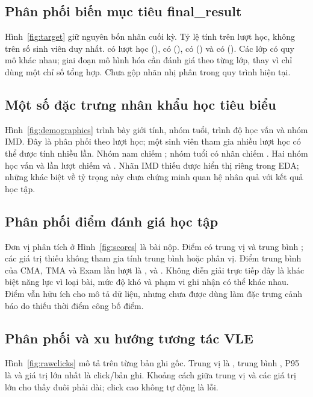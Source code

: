 \subsection{Phân phối biến mục tiêu final\_result}
Hình~\ref{fig:target} giữ nguyên bốn nhãn cuối kỳ. Tỷ lệ tính trên \NEnrollments{} lượt học, không trên số sinh viên duy nhất.
 có \NPass{} lượt học (\PctPass),  có \NWithdrawn{} (\PctWithdrawn),  có \NFail{} (\PctFail) và  có \NDistinction{} (\PctDistinction). Các lớp có quy mô khác nhau; giai đoạn mô hình hóa cần đánh giá theo từng lớp, thay vì chỉ dùng một chỉ số tổng hợp. Chưa gộp nhãn nhị phân trong quy trình hiện tại.

\subsection{Một số đặc trưng nhân khẩu học tiêu biểu}
Hình~\ref{fig:demographics} trình bày giới tính, nhóm tuổi, trình độ học vấn và nhóm IMD. Đây là phân phối theo lượt học; một sinh viên tham gia nhiều lượt học có thể được tính nhiều lần.
Nhóm nam chiếm \PctMale; nhóm tuổi có nhãn  chiếm \PctYoung. Hai nhóm học vấn  và  lần lượt chiếm \PctALevel{} và \PctLowerALevel. Nhãn IMD thiếu được hiển thị riêng trong EDA; những khác biệt về tỷ trọng này chưa chứng minh quan hệ nhân quả với kết quả học tập.

\subsection{Phân phối điểm đánh giá học tập}
Đơn vị phân tích ở Hình~\ref{fig:scores} là bài nộp. Điểm có trung vị \ScoreMedian{} và trung bình \ScoreMean; các giá trị thiếu không tham gia tính trung bình hoặc phân vị.
Điểm trung bình của CMA, TMA và Exam lần lượt là \ScoreMeanCMA, \ScoreMeanTMA{} và \ScoreMeanExam. Không diễn giải trực tiếp đây là khác biệt năng lực vì loại bài, mức độ khó và phạm vi ghi nhận có thể khác nhau. Điểm vẫn hữu ích cho mô tả dữ liệu, nhưng chưa được dùng làm đặc trưng cảnh báo do thiếu thời điểm công bố điểm.

\subsection{Phân phối và xu hướng tương tác VLE}
Hình~\ref{fig:rawclicks} mô tả  trên từng bản ghi gốc. Trung vị là \ClickMedian, trung bình \ClickMean, P95 là \ClickPninetyfive{} và giá trị lớn nhất là \ClickMax{} click/bản ghi. Khoảng cách giữa trung vị và các giá trị lớn cho thấy đuôi phải dài; click cao không tự động là lỗi.

